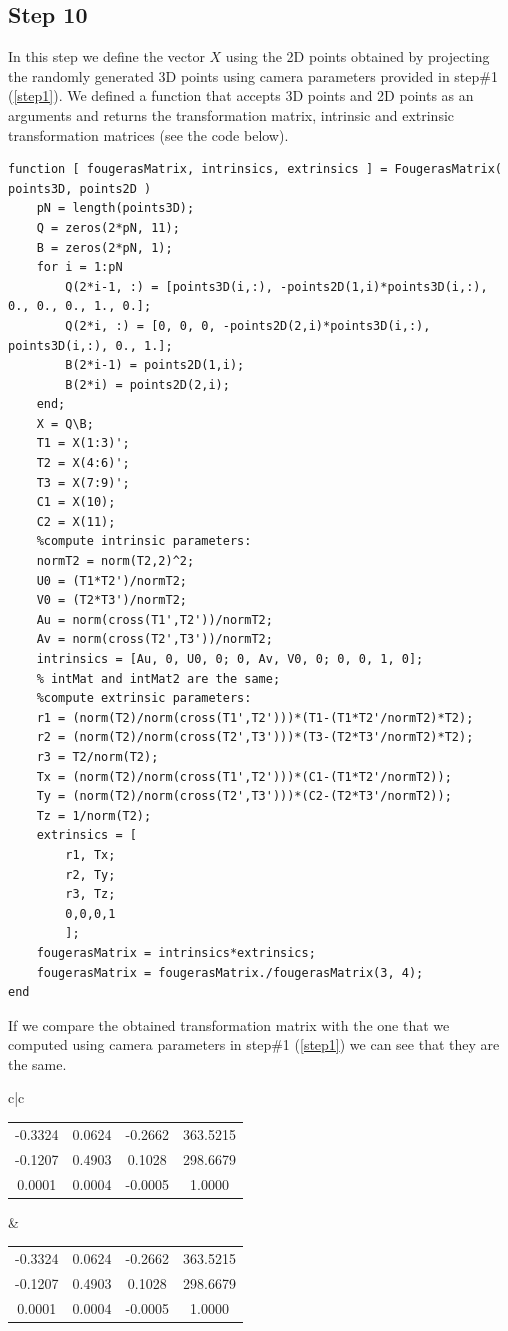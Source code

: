 \documentclass[a4paper, 10pt]{article}
\begin{document}
\subsection{Step 10}\label{step10}
In this step we define the vector $X$ using the 2D points obtained by projecting the randomly generated 3D points using camera parameters provided in step\#1 (\ref{step1}). We defined a function that accepts 3D points and 2D points as an arguments and returns the transformation matrix, intrinsic and extrinsic transformation matrices (see the code below).
\begin{lstlisting}
function [ fougerasMatrix, intrinsics, extrinsics ] = FougerasMatrix( points3D, points2D )
    pN = length(points3D);
    Q = zeros(2*pN, 11);
    B = zeros(2*pN, 1);
    for i = 1:pN
        Q(2*i-1, :) = [points3D(i,:), -points2D(1,i)*points3D(i,:), 0., 0., 0., 1., 0.];
        Q(2*i, :) = [0, 0, 0, -points2D(2,i)*points3D(i,:), points3D(i,:), 0., 1.];
        B(2*i-1) = points2D(1,i);
        B(2*i) = points2D(2,i);
    end;
    X = Q\B;
    T1 = X(1:3)';
    T2 = X(4:6)';
    T3 = X(7:9)';
    C1 = X(10);
    C2 = X(11);
    %compute intrinsic parameters:
    normT2 = norm(T2,2)^2;
    U0 = (T1*T2')/normT2;
    V0 = (T2*T3')/normT2;
    Au = norm(cross(T1',T2'))/normT2;
    Av = norm(cross(T2',T3'))/normT2;
    intrinsics = [Au, 0, U0, 0; 0, Av, V0, 0; 0, 0, 1, 0];
    % intMat and intMat2 are the same;
    %compute extrinsic parameters:
    r1 = (norm(T2)/norm(cross(T1',T2')))*(T1-(T1*T2'/normT2)*T2);
    r2 = (norm(T2)/norm(cross(T2',T3')))*(T3-(T2*T3'/normT2)*T2);
    r3 = T2/norm(T2);
    Tx = (norm(T2)/norm(cross(T1',T2')))*(C1-(T1*T2'/normT2));
    Ty = (norm(T2)/norm(cross(T2',T3')))*(C2-(T2*T3'/normT2));
    Tz = 1/norm(T2);
    extrinsics = [
        r1, Tx;
        r2, Ty;
        r3, Tz;
        0,0,0,1
        ];
    fougerasMatrix = intrinsics*extrinsics;
    fougerasMatrix = fougerasMatrix./fougerasMatrix(3, 4);
end
\end{lstlisting}
If we compare the obtained transformation matrix with the one that we computed using camera parameters in step\#1 (\ref{step1}) we can see that they are the same.
\begin{center}
\begin{tabular}{c|c}
	\begin{tabular}{cccc}
		-0.3324&0.0624&-0.2662&363.5215\\
   		-0.1207&0.4903&0.1028&298.6679\\
   		 0.0001&0.0004&-0.0005&1.0000
	\end{tabular}
	&
	\begin{tabular}{cccc}
		-0.3324&0.0624&-0.2662&363.5215\\
   		-0.1207&0.4903&0.1028&298.6679\\
   		 0.0001&0.0004&-0.0005&1.0000
	\end{tabular}
\end{tabular}
\end{center}
\end{document}
